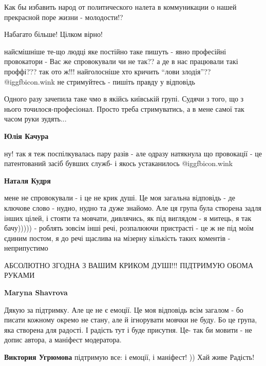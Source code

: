 \begin{itemize}
Как бы избавить народ от политического налета в коммуникации о нашей прекрасной
поре жизни - молодости!?


Набагато більше! Цілком вірно!


найсмішніше те-що людці яке постійно таке пишуть - явно професійні провокатори
- Вас же спровокували чи не так?? а де в нас працювали такі проффі??? так ото
ж!!! найголосніше хто кричить \enquote{лови злодія}?? @igg{fbicon.wink} не
стримуйтесь - пишіть правду у відповідь

\begin{itemize} %

Одного разу зачепила таке чмо в якійсь київській групі. Судячи з того, що з
нього точилося-професіонал. Просто треба стримуватись, а в мене самої так часом
руки зудять...

\textbf{Юлія Качура} 

ну! так я теж поспілкувалась пару разів - але одразу натякнула що провокації -
це патентований засіб бувших служб- і якось устаканилось @igg{fbicon.wink} 

\textbf{Наталя Кудря} 

мене не спровокували - і це не крик душі. Це моя загальна відповідь - де
ключове слово - нудно, нудно та дуже знайомо. Але ця група була створена задля
інших цілей, і стояти та мовчати, дивлячись, як під виглядом - я митець, я так
бачу))))) - роблять зовсім інші речі, розпалюючи пристрасті - це ж не під моїм
єдиним постом, я до речі щаслива на мізерну кількість таких коментів -
неприпустимо

\end{itemize} %


АБСОЛЮТНО ЗГОДНА З ВАШИМ КРИКОМ ДУШІ!!! ПІДТРИМУЮ ОБОМА РУКАМИ

\begin{itemize} %
\textbf{Maryna Shavrova} 

Дякую за підтримку. Але це не є емоції. Це моя відповідь всім загалом - бо
писати кожному окремо не стану, але й ігнорувати мовчки не буду. Бо це група,
яка створена для радості. І радість тут і буде присутня. Це- так би мовити - не
допис автора, а маніфест модератора.

\textbf{Виктория Угрюмова} підтримую все: і емоції, і маніфест! )) Хай живе Радість!


\end{itemize}
\end{itemize}
